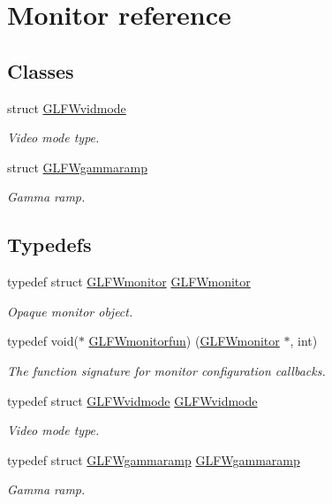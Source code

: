 \hypertarget{group__monitor}{}\section{Monitor reference}
\label{group__monitor}
\subsection*{Classes}
\begin{DoxyCompactItemize}
\item 
struct \hyperlink{structGLFWvidmode}{G\+L\+F\+Wvidmode}
\begin{DoxyCompactList}\small\item\em Video mode type. \end{DoxyCompactList}\item 
struct \hyperlink{structGLFWgammaramp}{G\+L\+F\+Wgammaramp}
\begin{DoxyCompactList}\small\item\em Gamma ramp. \end{DoxyCompactList}\end{DoxyCompactItemize}
\subsection*{Typedefs}
\begin{DoxyCompactItemize}
\item 
typedef struct \hyperlink{group__monitor_ga8d9efd1cde9426692c73fe40437d0ae3}{G\+L\+F\+Wmonitor} \hyperlink{group__monitor_ga8d9efd1cde9426692c73fe40437d0ae3}{G\+L\+F\+Wmonitor}
\begin{DoxyCompactList}\small\item\em Opaque monitor object. \end{DoxyCompactList}\item 
typedef void($\ast$ \hyperlink{group__monitor_ga8a7ee579a66720f24d656526f3e44c63}{G\+L\+F\+Wmonitorfun}) (\hyperlink{group__monitor_ga8d9efd1cde9426692c73fe40437d0ae3}{G\+L\+F\+Wmonitor} $\ast$, int)
\begin{DoxyCompactList}\small\item\em The function signature for monitor configuration callbacks. \end{DoxyCompactList}\item 
typedef struct \hyperlink{structGLFWvidmode}{G\+L\+F\+Wvidmode} \hyperlink{group__monitor_gae48aadf4ea0967e6605c8f58fa5daccb}{G\+L\+F\+Wvidmode}
\begin{DoxyCompactList}\small\item\em Video mode type. \end{DoxyCompactList}\item 
typedef struct \hyperlink{structGLFWgammaramp}{G\+L\+F\+Wgammaramp} \hyperlink{group__monitor_gaec0bd37af673be8813592849f13e02f0}{G\+L\+F\+Wgammaramp}
\begin{DoxyCompactList}\small\item\em Gamma ramp. \end{DoxyCompactList}\end{DoxyCompactItemize}
